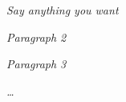 \newpage
\thispagestyle{onlypagenum}	
\vspace*{\fill}
\begin{center}
    \textit{
        Say anything you want
    }
    \par\bigskip
    \textit{
        Paragraph 2 \lipsum[1]
    }
    \par\bigskip
    \textit{
        Paragraph 3 \lipsum[1]
    }
    \par\bigskip
    \textit{
        \dots
    }
\end{center}
\vfill

\newpage
\thispagestyle{empty}
\cleardoublepage
\thispagestyle{empty}